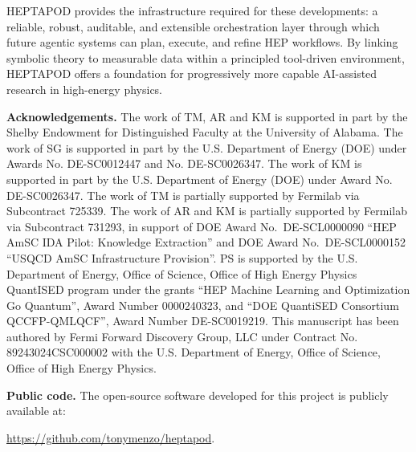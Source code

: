 \documentclass[11pt,oneside]{article}
\numberwithin{equation}{section}
\newcommand{\pkgname}{HEPTAPOD\xspace}
\begin{document}
\pkgname provides the infrastructure required for these developments: a reliable, robust, auditable, and extensible orchestration layer through which future agentic systems can plan, execute, and refine HEP workflows. 
By linking symbolic theory to measurable data within a principled tool-driven environment, \pkgname offers a foundation for progressively more capable AI-assisted research in high-energy physics.

{\bf Acknowledgements.} The work of TM, AR and KM is supported in part by the Shelby Endowment for Distinguished Faculty at the University of Alabama. The work of SG is supported in part by the U.S. Department of Energy (DOE) under Awards No. DE-SC0012447 and No. DE-SC0026347. The work of KM is supported in part by the U.S. Department of Energy (DOE) under Award No. DE-SC0026347.
The work of TM is partially supported by Fermilab via Subcontract 725339. 
The work of AR and KM is partially supported by Fermilab via Subcontract 731293, in support of DOE Award No.\ DE-SCL0000090 ``HEP AmSC IDA Pilot: Knowledge Extraction'' and DOE Award No.\ DE-SCL0000152 ``USQCD AmSC Infrastructure Provision''.
PS is supported by the U.S. Department of Energy, Office of Science, Office of High Energy Physics QuantISED program under the grants ``HEP Machine Learning and Optimization Go Quantum'', Award Number 0000240323, and ``DOE QuantiSED Consortium QCCFP-QMLQCF'', Award Number DE-SC0019219.
This manuscript has been authored by Fermi Forward Discovery Group, LLC under Contract No. 89243024CSC000002 with the U.S. Department of Energy, Office of Science, Office of High Energy Physics.

{\bf Public code.} The open-source software developed for this project is publicly available at:
\begin{center}
{\url{https://github.com/tonymenzo/heptapod}}.
\end{center}
\end{document}
